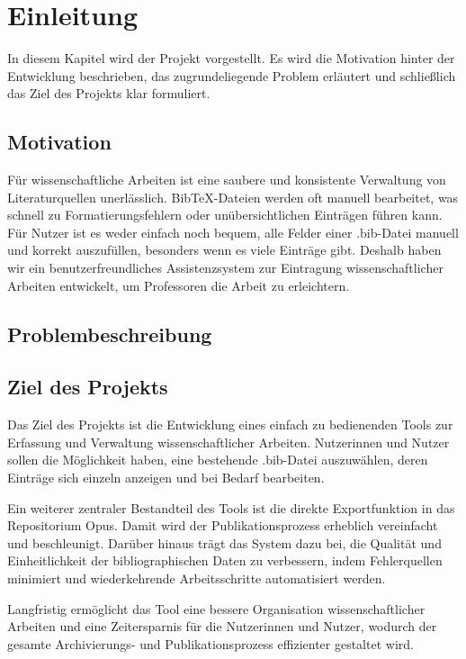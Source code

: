 \chapter{Einleitung}
In diesem Kapitel wird der Projekt vorgestellt. Es wird die Motivation 
hinter der Entwicklung beschrieben, das zugrundeliegende Problem erläutert
und schließlich das Ziel des Projekts klar formuliert. 

\section{Motivation}
Für wissenschaftliche Arbeiten ist eine saubere und konsistente Verwaltung 
von Literaturquellen unerlässlich. BibTeX-Dateien werden oft manuell 
bearbeitet, was schnell zu Formatierungsfehlern oder unübersichtlichen 
Einträgen führen kann. Für Nutzer ist es weder einfach noch bequem, 
alle Felder einer .bib-Datei manuell und korrekt auszufüllen, besonders 
wenn es viele Einträge gibt. Deshalb haben wir ein benutzerfreundliches 
Assistenzsystem zur Eintragung wissenschaftlicher Arbeiten entwickelt, 
um Professoren die Arbeit zu erleichtern.

\section{Problembeschreibung}


\section{Ziel des Projekts}
Das Ziel des Projekts ist die Entwicklung eines einfach zu bedienenden 
Tools zur Erfassung und Verwaltung wissenschaftlicher Arbeiten. 
Nutzerinnen und Nutzer sollen die Möglichkeit haben, eine bestehende 
.bib-Datei auszuwählen, deren Einträge sich einzeln anzeigen und bei 
Bedarf bearbeiten.

Ein weiterer zentraler Bestandteil des Tools ist die direkte Exportfunktion
in das Repositorium Opus. Damit wird der Publikationsprozess erheblich 
vereinfacht und beschleunigt. Darüber hinaus trägt das System dazu bei, 
die Qualität und Einheitlichkeit der bibliographischen Daten zu verbessern,
indem Fehlerquellen minimiert und wiederkehrende Arbeitsschritte 
automatisiert werden.

Langfristig ermöglicht das Tool eine bessere Organisation 
wissenschaftlicher Arbeiten und eine Zeitersparnis für die 
Nutzerinnen und Nutzer, wodurch der gesamte Archivierungs- 
und Publikationsprozess effizienter gestaltet wird.

